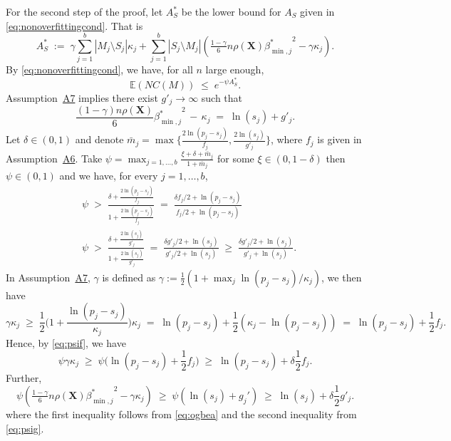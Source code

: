 \documentclass[bj,authoryear]{imsart}
\theoremstyle{plain}
\newcommand{\E}{\mathbb{E}}
\newcommand{\bs}{\boldsymbol}
\begin{document}
For the second step of the proof, let $A_S^*$ be the lower bound for $A_S$ given in \eqref{eq:nonoverfittingcond}. That is 
$$A_S^*\;:=\;\gamma\sum_{j=1}^b|M_j \setminus S_j|\kappa_j + \sum_{j=1}^b |S_j\setminus M_j |\left(\tfrac{1-\gamma}{6} n \rho(\bs X) {\beta^*_{\min,j}}^{2} - \gamma\kappa_j\right).$$
By \eqref{eq:nonoverfittingcond}, we have, for all $n$ large enough,
\begin{equation}\label{eq:boundexp}
    \E(NC(M))\;\leq\;e^{-\psi A_S^*}.
\end{equation}
Assumption~\hyperlink{lab:A7}{A7} implies there exist $g'_j \to \infty$ such that
\begin{equation}\label{eq:ogbea}
    \frac{(1-\gamma) n\rho(\bs X)}{6}{\beta_{\min,j}^*}^2 \,- \,\kappa_j \;=\; \ln(s_j) + g'_{j}.
\end{equation}
Let $\delta \in (0,1)$ and denote $\bar{m}_j=\max\big\{\frac{2\ln(p_j-s_j)}{f_j},\frac{2\ln(s_j)}{g'_{j}}\big\}$, where $f_j$ is given in Assumption~\hyperlink{lab:A6}{A6}. 
Take $\psi=\max_{j=1,\ldots,b}\frac{\xi + \delta + \bar{m}_j}{1+\bar{m}_j}$ for some $\xi \in(0, 1- \delta)$ then $\psi \in (0,1)$ and we have, for every $j=1,\ldots,b$,
\begin{align}
    &\psi \;>\; \frac{\delta + \frac{2\ln(p_j-s_j)}{f_j}}{1+\frac{2\ln(p_j-s_j)}{f_j}} \;=\; \frac{\delta f_j/2 + \ln(p_j-s_j)}{f_j/2 +\ln(p_j-s_j)} \label{eq:psif}\\
    &\psi \;>\; \frac{\delta + \frac{2\ln(s_j)}{g'_j}}{1+\frac{2\ln(s_j)}{g'_j}} \;=\;  \frac{\delta g'_j/2 + \ln(s_j)}{g'_j/2 +\ln(s_j)} \;\geq\; \frac{\delta g'_j/2 + \ln(s_j)}{g'_j +\ln(s_j)}.\label{eq:psig}
\end{align}
In Assumption~\hyperlink{lab:A7}{A7}, $\gamma$ is defined as $\gamma:=\tfrac12(1+\max_j\ln(p_j-s_j)/\kappa_j)$, we then have 
$$
\gamma\kappa_j\;\geq\;\frac12 \Big(1+\frac{\ln(p_j-s_j)}{\kappa_j}\Big)\kappa_j\;=\;\ln(p_j-s_j)+\frac12(\kappa_j-\ln(p_j-s_j)) \;=\; \ln(p_j-s_j)+ \frac12f_j.
$$
Hence, by \eqref{eq:psif}, we have
\begin{equation}\label{eq:ooofjfj}
\psi\gamma\kappa_j \;\geq\; \psi\big(\ln(p_j-s_j)+ \frac12f_j\big) \;\geq\;  \ln(p_j-s_j)+ \delta\frac12f_j.
\end{equation}
Further,
\begin{equation}\label{eq:ooofjfj2}
\psi\left(\tfrac{1-\gamma}{6} n \rho(\bs X) {\beta^*_{\min,j}}^{2} - \gamma\kappa_j\right) \;\geq\; \psi\left(\ln(s_j)+g_j'\right) \;\geq\; \ln(s_j)+\delta \frac{1}{2}g'_j.
\end{equation}
where the first inequality follows from \eqref{eq:ogbea} and the second inequality from \eqref{eq:psig}.
\end{document}
